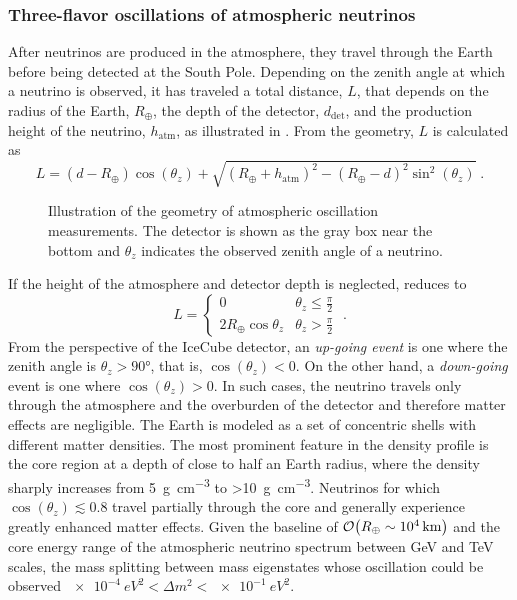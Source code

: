 \subsubsection{Three-flavor oscillations of atmospheric neutrinos}
After neutrinos are produced in the atmosphere, they travel through the Earth before being detected at the South Pole.
Depending on the zenith angle at which a neutrino is observed, it has traveled a total distance, $L$, that depends on the radius of the Earth, $R_\oplus$, the depth of the detector, $d_\mathrm{det}$, and the production height of the neutrino, $h_\mathrm{atm}$, as illustrated in .
From the geometry, $L$ is calculated as
\begin{equation}
    L = (d - R_\oplus)\cos(\theta_z) + \sqrt{(R_\oplus + h_\mathrm{atm})^2 - (R_\oplus - d)^2\sin^2(\theta_z)}\;.\label{eq:prop-distance}
\end{equation}
\begin{figure}
    \centering
    
    \caption{Illustration of the geometry of atmospheric oscillation measurements. The detector is shown as the gray box near the bottom and $\theta_z$ indicates the observed zenith angle of a neutrino.\label{fig:atmo-baseline-illustration}}
\end{figure}
If the height of the atmosphere and detector depth is neglected,  reduces to
\begin{equation}
    L =
    \begin{cases}
        0 & \theta_z \leq \frac{\pi}{2} \\
        2 R_\oplus \cos \theta_z & \theta_z > \frac{\pi}{2}
    \end{cases}\;.
\end{equation}
From the perspective of the IceCube detector, an \emph{up-going event} is one where the zenith angle is $\theta_z > \ang{90}$, that is, $\cos(\theta_z) < 0$. On the other hand, a \emph{down-going} event is one where $\cos(\theta_z) > 0$. In such cases, the neutrino travels only through the atmosphere and the overburden of the detector and therefore matter effects are negligible.  The Earth is modeled as a set of concentric shells with different matter densities. The most prominent feature in the density profile is the core region at a depth of close to half an Earth radius, where the density sharply increases from \SI{5}{\gram\per\centi\meter\cubed} to \SI{>10}{\gram\per\centi\meter\cubed}\cite{PREM}. Neutrinos for which $\cos(\theta_z) \lesssim 0.8$ travel partially through the core and generally experience greatly enhanced matter effects. Given the baseline of $\order{R_\oplus\sim\SI{e4}{km}}$ and the core energy range of the atmospheric neutrino spectrum between GeV and TeV scales, the mass splitting between mass eigenstates whose oscillation could be observed $\SI{e-4}{eV^2} < \Delta m^2 < \SI{e-1}{eV^2}$.

